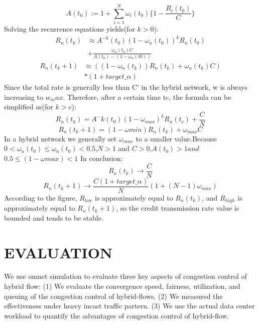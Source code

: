 \documentclass[conference]{IEEEtran}
\begin{document}
\begin{equation}
A(t_0):=1+\sum_{i=1}^N \omega_i(t_0)\lbrace 1-\frac{R_i(t_0)}{C} \rbrace
\end{equation}
Solving the recurrence equations yields(for $k>0$):
\begin{equation}
\begin{aligned}
R_n(t_k)&\approx A^{-k}(t_0)(1-\omega_n(t_0))^kR_n(t_0)\\
&+\frac{\omega_n(t_0)C}{A(t_0)-(1-\omega_n(t0))}
\end{aligned}
\end{equation}
\begin{equation}
\begin{aligned}
R_n(t_k+1)&\approx((1-\omega_n(t_k))R_n(t_k)+\omega_n(t_k)C)\\
&*(1+target\_\alpha)
\end{aligned}
\end{equation}
Since the total rate is generally less than C' in the hybrid network, w is always increasing to $w_max$. Therefore, after a certain time tc, the formula can be simplified as(for $k>c$):
\begin{equation}
R_n(t_k)=A^-k(t_0)(1-\omega_{max})^kR_n(t_c)+\frac{C}{N}
\end{equation}
\begin{equation}
R_n(t_k+1)=(1-\omega{min})R_n(t_k)+\omega_{max}C
\end{equation}
In a hybrid network we generally set $\omega_{max}$ to a smaller value.Because $0<\omega_n(t_0)\leqslant \omega_n(t_0)<0.5$,$N>1$ and $C>0$,$A(t_0)>1and$ $0.5\leqslant (1-\omega{max})<1$ 
In conclusion:
\begin{equation}
R_n(t_k)\to \frac{C}{N}
\end{equation}
\begin{equation}
R_n(t_k+1)\to \frac{C(1+target\_\alpha)}{N}(1+(N-1)\omega_{max})
\end{equation}
According to the figure, $R_{low}$ is approximately equal to $R_n(t_k)$, and $R_{high}$ is approximately equal to $R_n(t_k+1)$, so the credit transmission rate value is bounded and tends to be stable.
\section{EVALUATION}
We use omnet simulation to evaluate three key aspects of congestion control of hybrid flow: (1) We evaluate the convergence speed, fairness, utilization, and queuing of the congestion control of hybrid-flows. (2) We measured the effectiveness under heavy incast traffic partern. (3) We use the actual data center workload to quantify the advantages of congestion control of hybrid-flow.
\end{document}
